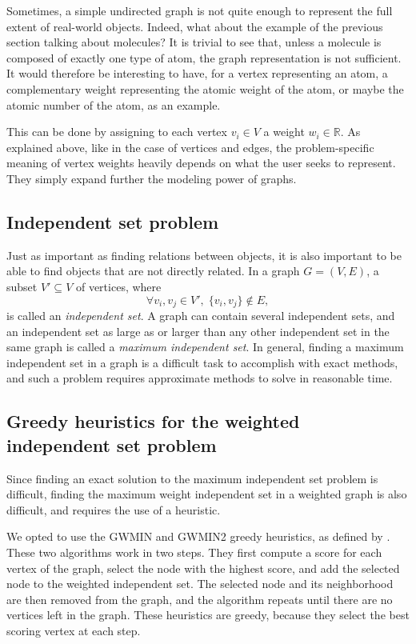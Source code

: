 \documentclass{mimosis}
\begin{document}
Sometimes, a simple undirected graph is not quite enough to represent the full extent of real-world objects. 
Indeed, what about the example of the previous section talking about molecules? 
It is trivial to see that, unless a molecule is composed of exactly one type of atom, the graph representation is not sufficient. 
It would therefore be interesting to have, for a vertex representing an atom, a complementary weight representing the atomic weight of the atom, or maybe the atomic number of the atom, as an example.

This can be done by assigning to each vertex \( v_i \in V \) a weight \( w_i \in \mathbb{R} \). 
As explained above, like in the case of vertices and edges, the problem-specific meaning of vertex weights heavily depends on what the user seeks to represent. 
They simply expand further the modeling power of graphs.

\subsection{Independent set problem}

Just as important as finding relations between objects, it is also important to be able to find objects that are not directly related. 
In a graph \( G = (V, E) \), a subset \( V' \subseteq V \) of vertices, where
\[
\forall v_i, v_j \in V', \; \{v_i, v_j\} \notin E,
\]
is called an \emph{independent set}. 
A graph can contain several independent sets, and an independent set as large as or larger than any other independent set in the same graph is called a \emph{maximum independent set}. 
In general, finding a maximum independent set in a graph is a difficult task to accomplish with exact methods, and such a problem requires approximate methods to solve in reasonable time.

\subsection{Greedy heuristics for the weighted independent set problem} %

Since finding an exact solution to the maximum independent set problem is difficult, finding the maximum weight independent set in a weighted graph is also difficult, and requires the use of a heuristic.

We opted to use the GWMIN and GWMIN2 greedy heuristics, as defined by \citet{sakai2003note}. These two algorithms work in two steps. They first compute a score for each vertex of the graph, select the node with the highest score, and add the selected node to the weighted independent set. The selected node and its neighborhood are then removed from the graph, and the algorithm repeats until there are no vertices left in the graph. These heuristics are greedy, because they select the best scoring vertex at each step.
\end{document}
